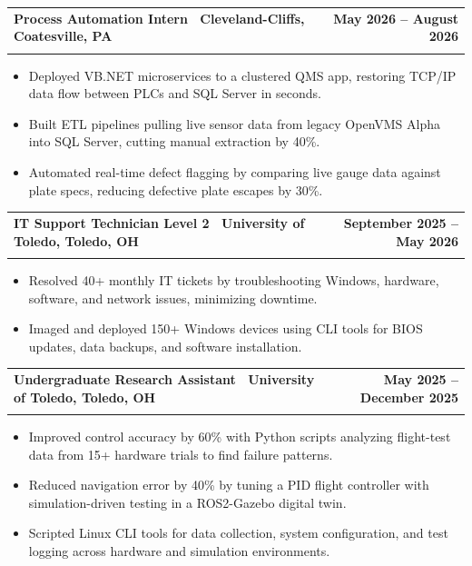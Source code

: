 \documentclass[letterpaper,11pt]{article}
\makeatletter
\newcommand{\resumeItem}[1]{\item\small{#1 \vspace{-4pt}}}
\newcommand{\resumeSubheading}[4]{
    \vspace{-2pt}\item
    \begin{tabular*}{1.0\textwidth}[t]{l@{\extracolsep{\fill}}r}
        \textbf{#1} & \textbf{\small #2} \\
        \textit{\small#3} & \textit{\small #4}
    \end{tabular*}\vspace{-7pt}
}
\newcommand{\resumeItemListStart}{\begin{itemize}}
\newcommand{\resumeItemListEnd}{\end{itemize}\vspace{-7pt}}
\makeatother
\begin{document}
\resumeSubheading
{\textbf{Process Automation Intern} \textnormal{\textbar\ Cleveland-Cliffs, Coatesville, PA}}{May 2026 -- August 2026}
{}{}
\vspace{-0.6cm}
\resumeItemListStart

\resumeItem{Deployed VB.NET microservices to a clustered QMS app, restoring TCP/IP data flow between PLCs and SQL Server in seconds.}

\vspace{0.15cm}

\resumeItem{Built ETL pipelines pulling live sensor data from legacy OpenVMS Alpha into SQL Server, cutting manual extraction by 40\%.}
\vspace{0.15cm}


\resumeItem{Automated real-time defect flagging by comparing live gauge data against plate specs, reducing defective plate escapes by 30\%.}





\vspace{0.15cm}
\resumeItemListEnd
\resumeSubheading
{\textbf{IT Support Technician Level 2} \textnormal{\textbar\ University of Toledo, Toledo, OH}}{September 2025 -- May 2026}
{}{}
\vspace{-0.6cm}
\resumeItemListStart

\resumeItem{Resolved 40+ monthly IT tickets by troubleshooting Windows, hardware, software, and network issues, minimizing downtime.}

\vspace{0.15cm}
\resumeItem{Imaged and deployed 150+ Windows devices using CLI tools for BIOS updates, data backups, and software installation.}

\vspace{0.15cm}

\resumeItemListEnd

\resumeSubheading
{\textbf{Undergraduate Research Assistant} \textnormal{\textbar\ University of Toledo, Toledo, OH}}{May 2025 -- December 2025}
{}{}
\vspace{-0.6cm}
\resumeItemListStart
\resumeItem{Improved control accuracy by 60\% with Python scripts analyzing flight-test data from 15+ hardware trials to find failure patterns.}
\vspace{0.15cm}
\resumeItem{Reduced navigation error by 40\% by tuning a PID flight controller with simulation-driven testing in a ROS2-Gazebo digital twin.}
\vspace{0.15cm}
\resumeItem{Scripted Linux CLI tools for data collection, system configuration, and test logging across hardware and simulation environments.}
\resumeItemListEnd
\end{document}
